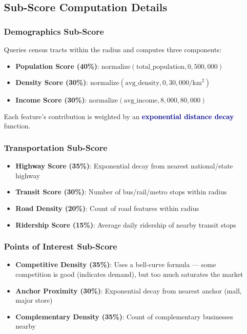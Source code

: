 \documentclass[12pt, a4paper]{article}
\newcommand{\concept}[1]{\textbf{\textcolor{darkblue}{#1}}}
\begin{document}
\subsection{Sub-Score Computation Details}

\subsubsection{Demographics Sub-Score}

Queries census tracts within the radius and computes three components:

\begin{itemize}[leftmargin=2em]
    \item \textbf{Population Score (40\%)}: $\text{normalize}(\text{total\_population}, 0, 500{,}000)$
    \item \textbf{Density Score (30\%)}: $\text{normalize}(\text{avg\_density}, 0, 30{,}000/\text{km}^2)$
    \item \textbf{Income Score (30\%)}: $\text{normalize}(\text{avg\_income}, 8{,}000, 80{,}000)$
\end{itemize}

Each feature's contribution is weighted by an \concept{exponential distance decay} function.

\subsubsection{Transportation Sub-Score}

\begin{itemize}[leftmargin=2em]
    \item \textbf{Highway Score (35\%)}: Exponential decay from nearest national/state highway
    \item \textbf{Transit Score (30\%)}: Number of bus/rail/metro stops within radius
    \item \textbf{Road Density (20\%)}: Count of road features within radius
    \item \textbf{Ridership Score (15\%)}: Average daily ridership of nearby transit stops
\end{itemize}

\subsubsection{Points of Interest Sub-Score}

\begin{itemize}[leftmargin=2em]
    \item \textbf{Competitive Density (35\%)}: Uses a bell-curve formula — some competition is
          good (indicates demand), but too much saturates the market
    \item \textbf{Anchor Proximity (30\%)}: Exponential decay from nearest anchor (mall, major store)
    \item \textbf{Complementary Density (35\%)}: Count of complementary businesses nearby
\end{itemize}
\end{document}
